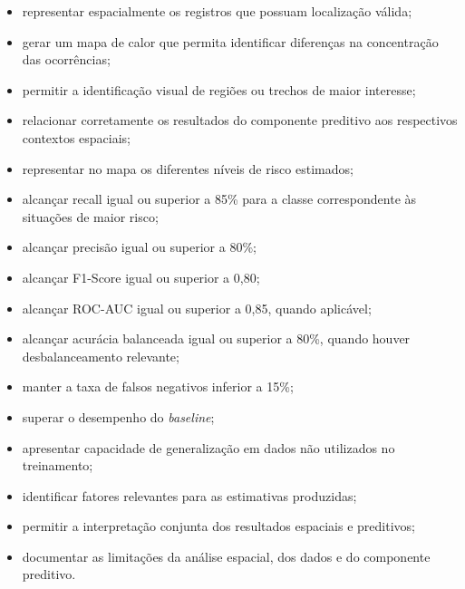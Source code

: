 \documentclass[11pt,a4paper]{article}
\begin{document}
\begin{itemize}

    \item representar espacialmente os registros que possuam localização válida;

    \item gerar um mapa de calor que permita identificar diferenças na concentração das ocorrências;

    \item permitir a identificação visual de regiões ou trechos de maior interesse;

    \item relacionar corretamente os resultados do componente preditivo aos respectivos contextos espaciais;

    \item representar no mapa os diferentes níveis de risco estimados;

    \item alcançar recall igual ou superior a 85\% para a classe correspondente às situações de maior risco;

    \item alcançar precisão igual ou superior a 80\%;

    \item alcançar F1-Score igual ou superior a 0,80;

    \item alcançar ROC-AUC igual ou superior a 0,85, quando aplicável;

    \item alcançar acurácia balanceada igual ou superior a 80\%, quando houver desbalanceamento relevante;

    \item manter a taxa de falsos negativos inferior a 15\%;

    \item superar o desempenho do \textit{baseline};

    \item apresentar capacidade de generalização em dados não utilizados no treinamento;

    \item identificar fatores relevantes para as estimativas produzidas;

    \item permitir a interpretação conjunta dos resultados espaciais e preditivos;

    \item documentar as limitações da análise espacial, dos dados e do componente preditivo.

\end{itemize}
\end{document}
